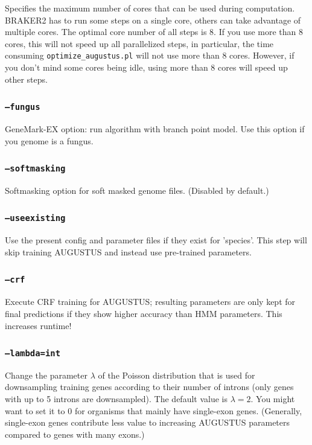 \documentclass[]{article}
\begin{document}
Specifies the maximum number of cores that can be used during
computation. BRAKER2 has to run some steps on a single core, others can
take advantage of multiple cores. The optimal core number of all steps
is 8. If you use more than 8 cores, this will not speed up all
parallelized steps, in particular, the time consuming
\texttt{optimize\_augustus.pl} will not use more than 8 cores. However,
if you don't mind some cores being idle, using more than 8 cores will
speed up other steps.

\subsubsection{\texorpdfstring{\texttt{–fungus}}{--fungus}}\label{fungus}

GeneMark-EX option: run algorithm with branch point model. Use this
option if you genome is a fungus.

\subsubsection{\texorpdfstring{\texttt{–softmasking}}{--softmasking}}\label{softmasking}

Softmasking option for soft masked genome files. (Disabled by default.)

\subsubsection{\texorpdfstring{\texttt{–useexisting}}{--useexisting}}\label{useexisting}

Use the present config and parameter files if they exist for 'species'.
This step will skip training AUGUSTUS and instead use pre-trained
parameters.

\subsubsection{\texorpdfstring{\texttt{–crf}}{--crf}}\label{crf}

Execute CRF training for AUGUSTUS; resulting parameters are only kept
for final predictions if they show higher accuracy than HMM parameters.
This increases runtime!

\subsubsection{\texorpdfstring{\texttt{–lambda=int}}{--lambda=int}}\label{lambdaint}

Change the parameter \(\lambda\) of the Poisson distribution that is
used for downsampling training genes according to their number of
introns (only genes with up to 5 introns are downsampled). The default
value is \(\lambda=2\). You might want to set it to 0 for organisms that
mainly have single-exon genes. (Generally, single-exon genes contribute
less value to increasing AUGUSTUS parameters compared to genes with many
exons.)
\end{document}
